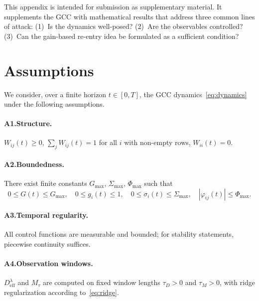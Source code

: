 \documentclass[11pt,a4paper]{article}
\theoremstyle{plain}
\theoremstyle{definition}
\theoremstyle{remark}
\newcommand{\Deff}{D_{\mathrm{eff}}}
\newcommand{\Mtau}{M_{\tau}}
\newcommand{\Gmax}{G_{\max}}
\begin{document}
\titleformat{\section}{\large\bfseries}{\thesection}{0.6em}{}
\titlespacing*{\section}{0pt}{1.5em}{0.8em}

This appendix is intended for submission as supplementary material. It supplements the GCC with mathematical results that address three common lines of attack: (1)~Is the dynamics well-posed? (2)~Are the observables controlled? (3)~Can the gain-based re-entry idea be formulated as a sufficient condition?

\section{Assumptions}
\label{app:voraussetzungen}

We consider, over a finite horizon $t \in [0,T]$, the GCC dynamics~\eqref{eq:dynamics} under the following assumptions.

\paragraph{A1.\;Structure.}
$W_{ij}(t) \geq 0$, \;\;$\sum_j W_{ij}(t) = 1$ for all $i$ with non-empty rows, \;\;$W_{ii}(t) = 0$.

\paragraph{A2.\;Boundedness.}
There exist finite constants $\Gmax$, $\Sigma_{\max}$, $\Phi_{\max}$ such that
\[
0 \leq G(t) \leq \Gmax, \quad
0 \leq g_i(t) \leq 1, \quad
0 \leq \sigma_i(t) \leq \Sigma_{\max}, \quad
|\varphi_{ij}(t)| \leq \Phi_{\max}.
\]

\paragraph{A3.\;Temporal regularity.}
All control functions are measurable and bounded; for stability statements, piecewise continuity suffices.

\paragraph{A4.\;Observation windows.}
$\Deff^{\lambda}$ and $\Mtau$ are computed on fixed window lengths $\tau_D > 0$ and $\tau_M > 0$, with ridge regularization according to~\eqref{eq:ridge}.
\end{document}
